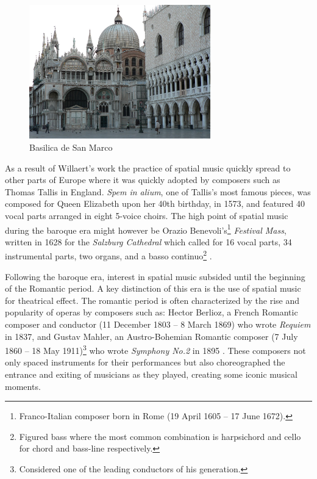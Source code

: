 \begin{figure}[ht!]%
\centering
\includegraphics[width=0.7\textwidth]{img/basilica-san-marcos.JPG} 
\caption{Basilica de San Marco \cite{Venbasil3:online}}
\end{figure}

As a result of Willaert's work the practice of spatial music quickly spread to other parts of Europe where it was quickly adopted by composers such as Thomas Tallis in England. \textit{Spem in alium}, one of Tallis's most famous pieces, was composed for Queen Elizabeth upon her 40th birthday, in 1573, and featured 40 vocal parts arranged in eight 5-voice choirs. The high point of spatial music during the baroque era might however be Orazio Benevoli's\footnote{Franco-Italian composer born in Rome (19 April 1605 – 17 June 1672).} \textit{Festival Mass}, written in 1628 for the \textit{Salzburg Cathedral} which called for 16 vocal parts, 34 instrumental parts, two organs, and a basso continuo\footnote{Figured bass where the most common combination is harpsichord and cello for chord and bass-line respectively.} \cite{zvonar1999history}.

Following the baroque era, interest in spatial music subsided until the beginning of the Romantic period. A key distinction of this era is the use of spatial music for theatrical effect. The romantic period is often characterized by the rise and popularity of operas by composers such as: Hector Berlioz, a French Romantic composer and conductor (11 December 1803 – 8 March 1869) who wrote \textit{Requiem} in 1837, and Gustav Mahler, an Austro-Bohemian Romantic composer (7 July 1860 – 18 May 1911)\footnote{Considered one of the leading conductors of his generation.} who wrote \textit{Symphony No.2} in 1895 \cite{einstein1948music}. These composers not only spaced instruments for their performances but also choreographed the entrance and exiting of musicians as they played, creating some iconic musical moments.

